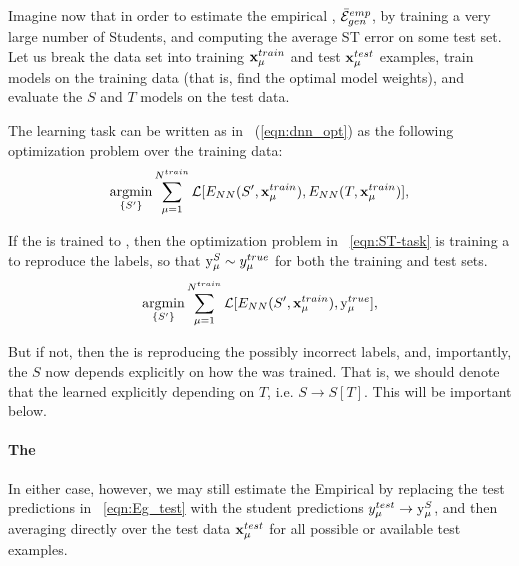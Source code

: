 Imagine now that in order to estimate the empirical \AverageGeneralizationError, $\bar{\mathcal{E}}^{emp}_{gen}$,
by training a very large number of Students, and computing the average ST error on some test set.
Let us break the data set into training $\mathbf{x}_{\mu}^{train}$ and test $\mathbf{x}_{\mu}^{test}$ examples, 
train models on the training data (that is, find the optimal model weights), 
and evaluate the $S$ and $T$ models on the test data.

The \Student learning task can be written as in \EQN~(\ref{eqn:dnn_opt})
as the following optimization problem over the training data:
\begin{align}
\underset{\{S'\}}{\text{argmin}}\sum_{\mu=1}^{N^{train}}\mathcal{L}[E_{NN}(S',\mathbf{x}_{\mu}^{train}),E_{NN}(T,\mathbf{x}_{\mu}^{train})]   ,
\label{eqn:ST-learning-task}
\end{align}

If the \Teacher is trained to \Interpolation, then the optimization problem in \EQN~\ref{eqn:ST-task} is
training a \Student to reproduce the \GroundTruth labels, so that $\mathrm{y}_{\mu}^{S}\sim y_{\mu}^{true}$
for both the training and test sets.
\begin{align}
\underset{\{S'\}}{\text{argmin}}\sum_{\mu=1}^{N^{train}}\mathcal{L}[E_{NN}(S',\mathbf{x}_{\mu}^{train}),\mathrm{y}_{\mu}^{true}]   ,
\label{eqn:ST-learning-intepolation}
\end{align}

But if not, then the \Student is reproducing the possibly
incorrect \Teacher labels, and, importantly, the \Student $S$ now depends explicitly
on how the \Teacher was trained.  That is, we should denote that the learned
\Student explicitly depending on $T$, i.e. $S\rightarrow S[T]$.
This will be important below.

\paragraph{The \AverageGeneralizationError}
In either case, however, we may still estimate the Empirical \AverageGeneralizationError
by replacing the test predictions in \EQN~\ref{eqn:Eg_test} with the student predictions
$y_{\mu}^{test}\rightarrow \mathrm{y}_{\mu}^{S}$, and then averaging directly over the test data $\mathbf{x}_{\mu}^{test}$
for all possible or available test examples.

